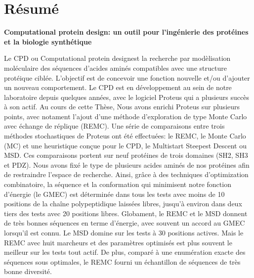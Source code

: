 

\section*{Résumé}

{\large\bf\noindent Computational protein design: un outil pour l'ingénierie des protéines et la biologie synthétique}

\bigskip

Le CPD ou \og Computational protein design\fg est la recherche par modèlisation moléculaire des séquences d'acides aminés compatibles avec une structure protéique ciblée.
L'objectif est de concevoir une fonction nouvelle et/ou d'ajouter un nouveau comportement.
Le CPD est en développement au sein de notre laboratoire depuis quelques années, avec le logiciel Proteus qui a plusieurs succès à son actif.
Au cours de cette Thèse, Nous avons enrichi Proteus sur plusieurs points, avec notament l'ajout d'une méthode d'exploration de type Monte Carlo avec échange de réplique (REMC). Une série de comparaisons entre trois méthodes stochastiques de Proteus ont été effectuées: le REMC, le Monte Carlo (MC) et une heuristique conçue pour le CPD, le Multistart Steepest Descent ou MSD. Ces comparaisons portent sur neuf protéines de trois domaines (SH2, SH3 et PDZ). Nous avons fixé le type de plusieurs acides aminés de nos protéines afin de restraindre l'espace de recherche. Ainsi, grâce à des techniques d'optimization combinatoire, la séquence et la conformation qui minimisent notre fonction d'énergie (le GMEC) est déterminée dans tous les tests avec moins de 10 positions de la chaîne polypeptidique laissées libres, jusqu'à environ dans deux tiers des tests avec 20 positions libres. Globament, le REMC et le MSD donnent de très bonnes séquences en terme d'énergie, avec souvent un accord au GMEC lorsqu'il est connu. Le MSD domine sur les tests à 30 positions actives. Mais le REMC avec huit marcheurs et des paramètres optimisés est plus souvent le meilleur sur les tests tout actif. De plus, comparé à une enumération exacte des séquences sous optimales, le REMC fourni un échantillon de séquences de très bonne diversité.

